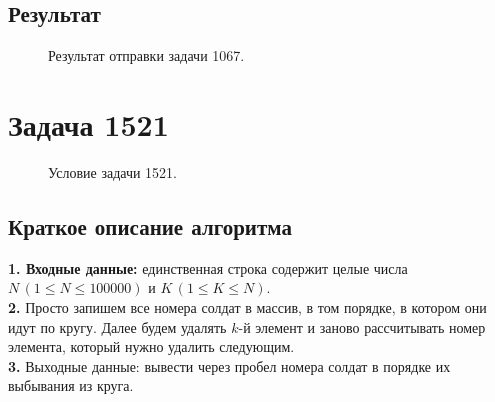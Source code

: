 \documentclass[a5paper, 10pt]{article}
\theoremstyle{definition}
\theoremstyle{plain}
\theoremstyle{remark}
\begin{document}
\subsection{Результат}
\begin{figure}[h!]
\caption{Результат отправки задачи 1067.}
\end{figure}




\newpage
\section{Задача 1521}

\begin{figure}[h!]
\caption{Условие задачи 1521.}
\end{figure}

\subsection{Краткое описание алгоритма}
\textbf{1. Входные данные:} единственная строка содержит целые числа $N\, (1 \leq N \leq 100000)$ и $K \, (1 \leq K \leq N)$. \\
\textbf{2.} Просто запишем все номера солдат в массив, в том порядке, в котором они идут по кругу. Далее будем удалять $k$-й элемент и заново рассчитывать номер элемента, который нужно удалить следующим. \\
\textbf{3.} Выходные данные: вывести через пробел номера солдат в порядке их выбывания из круга.
\end{document}
